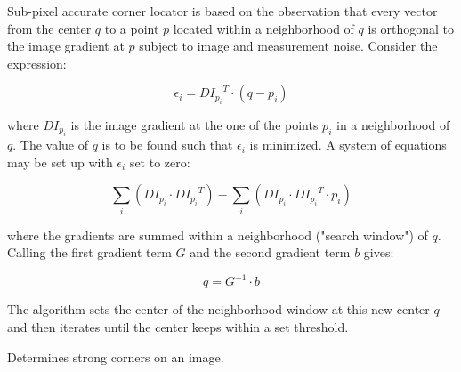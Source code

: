 Sub-pixel accurate corner locator is based on the observation that every vector from the center $q$ to a point $p$ located within a neighborhood of $q$ is orthogonal to the image gradient at $p$ subject to image and measurement noise. Consider the expression:

\[
\epsilon_i = {DI_{p_i}}^T \cdot (q - p_i)
\]

where ${DI_{p_i}}$ is the image gradient at the one of the points $p_i$ in a neighborhood of $q$. The value of $q$ is to be found such that $\epsilon_i$ is minimized. A system of equations may be set up with $\epsilon_i$ set to zero:

\[
\sum_i(DI_{p_i} \cdot {DI_{p_i}}^T) - \sum_i(DI_{p_i} \cdot {DI_{p_i}}^T \cdot p_i)
\]

where the gradients are summed within a neighborhood ("search window") of $q$. Calling the first gradient term $G$ and the second gradient term $b$ gives:

\[
q = G^{-1} \cdot b
\]

The algorithm sets the center of the neighborhood window at this new center $q$ and then iterates until the center keeps within a set threshold.

\label{GoodFeaturesToTrack}
Determines strong corners on an image.


